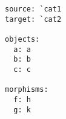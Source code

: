 \par\begin{minipage}{60ex}
\begin{verbatim}
source: `cat1
target: `cat2

objects:
  a: a
  b: b
  c: c

morphisms:
  f: h
  g: k


\end{verbatim}
\end{minipage}\par